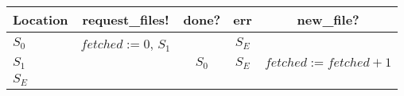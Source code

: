 \begin{tabular}{|l||c|c|c|c|}
 \hline

 \textbf{Location}
 & \textbf{request\_files!}
 & \textbf{done?}
 & \textbf{err}
 & \textbf{new\_file?}
 \\

 \hline

 $S_0$

 & $fetched := 0$, $S_1$
 & \disablecell{}
 & $S_E$
 & \disablecell{}
 \\
 \hline

 $S_1$

 & \disablecell{}
 & $S_0$
 & $S_E$
 & $fetched := fetched + 1$
 \\
 \hline
 $S_E$

 & \disablecell{}
 & \disablecell{}
 & \disablecell{}
 & \disablecell{}
 \\
 \hline
\end{tabular}%
